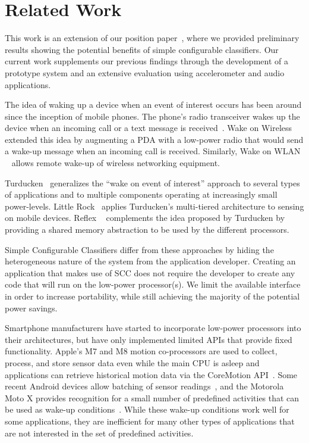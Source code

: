 \section{Related Work}\label{sec:related}

This work is an extension of our position paper~\cite{jingoiSCCposition}, 
where we provided preliminary results showing the potential benefits
of simple configurable classifiers. Our current work supplements our 
previous findings through the development of
a prototype system and an extensive evaluation using accelerometer 
and audio applications.

The idea of waking up a device when an event of interest occurs has been 
around since the inception of mobile phones. The phone's radio 
transceiver wakes up the device when an incoming call or a text message 
is received~\cite{gobi}. Wake on Wireless~\cite{shih2002wake} extended this idea by 
augmenting a PDA with a low-power radio that would send a wake-up message 
when an incoming call is received. Similarly, Wake on WLAN
~\cite{mishra2006wake} allows remote wake-up of wireless networking
equipment.

Turducken~\cite{turducken} generalizes the ``wake on event of interest'' 
approach to several types of applications and to multiple components 
operating at increasingly small power-levels. Little Rock~\cite{littlerock} 
applies Turducken's multi-tiered architecture to sensing on mobile 
devices. Reflex ~\cite{reflex} complements the idea proposed by Turducken 
by providing a shared memory abstraction to be used by the different 
processors.

Simple Configurable Classifiers differ from these approaches by hiding the heterogeneous 
nature of the system from the application developer. Creating an 
application that makes use of SCC does not require 
the developer to create any code that will run on the low-power 
processor(s).  We limit the available interface in order to increase 
portability, 
while still achieving the majority of the potential power savings.

Smartphone manufacturers have started to incorporate low-power
processors into their architectures, but have only implemented limited
APIs that provide fixed functionality.  Apple's M7 and M8 motion
co-processors are used to collect, process, and store sensor data 
even while the main CPU is asleep and applications can retrieve 
historical motion data via the CoreMotion API~\cite{coreMotion}.  Some
recent Android devices allow
batching of sensor readings~\cite{android4.4}, and the
Motorola Moto X provides recognition for a small number of predefined
activities that can be used as wake-up 
conditions~\cite{motox,x8mobile}.  While
these wake-up conditions work well for some applications, they are
inefficient for many other types of applications that are not
interested in the set of predefined activities.

